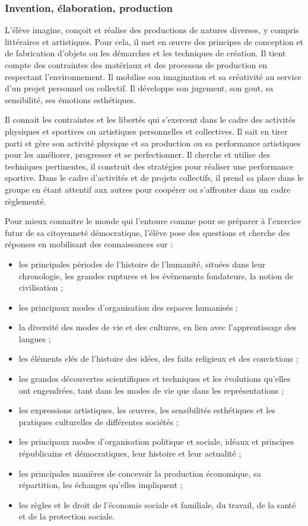 \subsubsection{Invention, élaboration, production}
L’élève imagine, conçoit et réalise des productions de natures diverses, y compris littéraires et artistiques. Pour cela, il met en œuvre des principes de conception et de fabrication d’objets ou les démarches et les techniques de création. Il tient compte des contraintes des matériaux et des processus de production en respectant l’environnement. Il mobilise son imagination et sa créativité au service d’un projet personnel ou collectif. Il développe son jugement, son gout, sa sensibilité, ses émotions esthétiques.

Il connait les contraintes et les libertés qui s’exercent dans le cadre des activités physiques et sportives ou artistiques personnelles et collectives. Il sait en tirer parti et gère son activité physique et sa production ou sa performance artistiques pour les améliorer, progresser et se perfectionner. Il cherche et utilise des techniques pertinentes, il construit des stratégies pour réaliser une performance sportive. Dans le cadre d’activités et de projets collectifs, il prend sa place dans le groupe en étant attentif aux autres pour coopérer ou s’affronter dans un cadre règlementé.
 
Pour mieux connaitre le monde qui l’entoure comme pour se préparer à l’exercice futur de sa citoyenneté démocratique, l’élève pose des questions et cherche des réponses en mobilisant des connaissances sur :
\begin{itemize}
\item les principales périodes de l’histoire de l’humanité, situées dans leur chronologie, les grandes ruptures et les évènements fondateurs, la notion de civilisation ;
\item les principaux modes d’organisation des espaces humanisés ;
\item la diversité des modes de vie et des cultures, en lien avec l’apprentissage des langues ;
\item les éléments clés de l’histoire des idées, des faits religieux et des convictions ;
\item les grandes découvertes scientifiques et techniques et les évolutions qu’elles ont engendrées, tant dans les modes de vie que dans les représentations ;
\item les expressions artistiques, les œuvres, les sensibilités esthétiques et les pratiques culturelles de différentes sociétés ;
\item les principaux modes d’organisation politique et sociale, idéaux et principes républicains et démocratiques, leur histoire et leur actualité ;
\item les principales manières de concevoir la production économique, sa répartition, les échanges qu’elles impliquent ;
\item les règles et le droit de l’économie sociale et familiale, du travail, de la santé et de la protection sociale.\end{itemize}